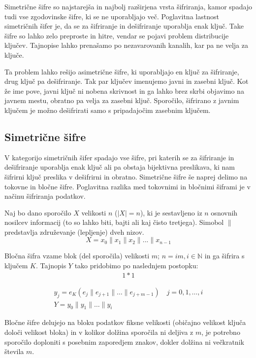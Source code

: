 \documentclass[12pt,a4paper,openany]{book}
\begin{document}
Simetrične šifre so najstarejša in najbolj razširjena vrsta šifriranja, kamor spadajo tudi vse zgodovinske šifre, ki se ne uporabljajo več. Poglavitna lastnost simetričnih šifer je, da se za šifriranje in dešifriranje uporablja enak ključ. Take šifre so lahko zelo preproste in hitre, vendar se pojavi problem distribucije ključev. Tajnopise lahko prenašamo po nezavarovanih kanalih, kar pa ne velja za ključe.

Ta problem lahko rešijo asimetrične šifre, ki uporabljajo en ključ za šifriranje, drug ključ pa dešifriranje. Tak par ključev imenujemo javni in zasebni ključ. Kot že ime pove, javni ključ ni nobena skrivnost in ga lahko brez skrbi objavimo na javnem mestu, obratno pa velja za zasebni ključ. Sporočilo, šifrirano z javnim ključem je možno dešifrirati samo s pripadajočim zasebnim ključem.

\subsection{Simetrične šifre}

V kategorijo simetričnih šifer spadajo vse šifre, pri katerih se za šifriranje in dešifriranje uporablja enak ključ ali pa obstaja bijektivna preslikava, ki nam šifrirni ključ preslika v dešifrirni in obratno. Simetrične šifre še naprej delimo na tokovne in bločne šifre. Poglavitna razlika med tokovnimi in bločnimi šiframi je v načinu šifriranja podatkov.

Naj bo dano sporočilo $X$ velikosti $n$ ($|X|=n$), ki je sestavljeno iz $n$ osnovnih nosilcev informacij (to so lahko biti, bajti ali kaj čisto tretjega). Simobol $\|$ predstavlja združevanje (lepljenje) dveh nizov.
$$
X=x_0\|x_1\|x_2\|...\|x_{n-1}
$$

Bločna šifra vzame blok (del sporočila) velikosti $m$; $n=im, i\in\mathbb{N} $ in ga šifrira s ključem $K$. Tajnopis $Y$ tako pridobimo po naslednjem postopku:
\begin{align*}
1*1
\end{align*}


\begin{gather*}
	y_j = e_K(e_{j} \| e_{j+1} \| \ldots \| e_{j+m-1})  \quad j=0,1,\ldots,i\\
	Y = y_0\|y_1\|\ldots\|y_i
\end{gather*}

Bločne šifre delujejo na bloku podatkov fiksne velikosti (običajno velikost ključa določi velikost bloka) in v kolikor dolžina sporočila ni deljiva z $m$, je potrebno sporočilo doploniti s posebnim zaporedjem znakov, dokler dolžina ni večkratnik števila $m$.
\end{document}
